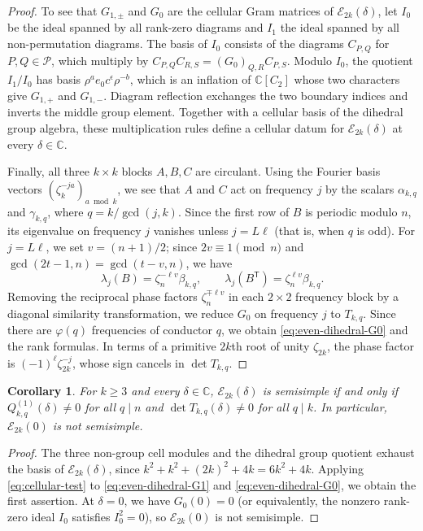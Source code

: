 \documentclass[11pt,a4paper]{amsart}
\newtheorem{corollary}[theorem]{Corollary}
\theoremstyle{uprightdefinition}
\theoremstyle{remark}\newtheorem{remark}[theorem]{Remark}
\begin{document}
\begin{proof}
To see that $G_{1,\pm}$ and $G_0$ are the cellular Gram matrices of $\mathcal E_{2k}(\delta)$, let $I_0$ be the ideal spanned by all
rank-zero diagrams and $I_1$ the ideal spanned by all non-permutation diagrams.
The basis of $I_0$ consists of the diagrams $C_{P,Q}$ for $P,Q\in\mathcal P$,
which multiply by
$C_{P,Q}C_{R,S}=(G_0)_{Q,R}C_{P,S}$.
Modulo $I_0$, the quotient $I_1/I_0$ has basis
$\rho^a e_0c^\epsilon\rho^{-b}$, which is an inflation of
$\mathbb C[C_2]$ whose two characters give $G_{1,+}$ and $G_{1,-}$.
Diagram reflection exchanges the two boundary indices and inverts
the middle group element. Together with a cellular basis of the dihedral
group algebra, these multiplication rules define a cellular datum for
$\mathcal E_{2k}(\delta)$ at every $\delta\in\mathbb C$.

Finally, all three $k\times k$ blocks $A,B,C$ are circulant. Using the Fourier basis vectors
$(\zeta_k^{-ja})_{a\bmod k}$, we see that $A$ and $C$ act on frequency $j$ by the scalars $\alpha_{k,q}$ and $\gamma_{k,q}$, where
$q=k/\gcd(j,k)$. Since the first row of $B$
is periodic modulo $n$, its eigenvalue on frequency $j$ vanishes unless $j=L\ell$ (that is, when $q$ is odd).
For $j=L\ell$, we set $v=(n+1)/2$; since $2v\equiv1\pmod n$ and $\gcd(2t-1,n)=\gcd(t-v,n)$, we have
\[
 \lambda_j(B)=\zeta_n^{-\ell v}\beta_{k,q},\qquad
 \lambda_j(B^{\mathsf T})=\zeta_n^{\ell v}\beta_{k,q}.
\]
Removing the reciprocal phase factors $\zeta_n^{\mp\ell v}$ in each $2\times2$ frequency block by a diagonal similarity transformation, we reduce $G_0$ on frequency $j$ to $T_{k,q}$.
Since there are $\varphi(q)$ frequencies of conductor $q$, we obtain
\eqref{eq:even-dihedral-G0} and the rank formulas. In terms of a primitive
$2k$th root of unity $\zeta_{2k}$, the phase factor is
$(-1)^\ell\zeta_{2k}^{-j}$, whose sign cancels in $\det T_{k,q}$.
\end{proof}

\begin{corollary}\label{cor:even-dihedral-structure}
For $k\ge3$ and every $\delta\in\mathbb C$,
$\mathcal E_{2k}(\delta)$ is semisimple if and only if
$Q^{(1)}_{k,q}(\delta)\ne0$ for all $q\mid n$ and
$\det T_{k,q}(\delta)\ne0$ for all $q\mid k$.
In particular, $\mathcal E_{2k}(0)$ is not semisimple.
\end{corollary}
\begin{proof}
The three non-group cell modules and the dihedral group quotient exhaust
the basis of $\mathcal E_{2k}(\delta)$, since $k^2+k^2+(2k)^2+4k=6k^2+4k$.
Applying \eqref{eq:cellular-test} to
\eqref{eq:even-dihedral-G1} and \eqref{eq:even-dihedral-G0}, we obtain the first assertion.
At $\delta=0$, we have $G_0(0)=0$ (or equivalently, the nonzero
rank-zero ideal $I_0$ satisfies $I_0^2=0$), so $\mathcal E_{2k}(0)$ is not semisimple.
\end{proof}
\end{document}

